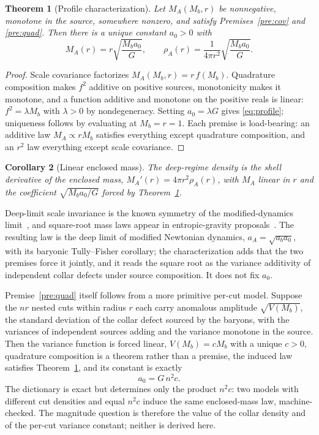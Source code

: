 \documentclass[11pt]{article}
\newtheorem{theorem}{Theorem}[section]
\newtheorem{corollary}[theorem]{Corollary}
\begin{document}
\begin{theorem}[Profile characterization]
\label{thm:char}
Let \(M_A(M_b,r)\) be nonnegative, monotone in the source, somewhere
nonzero, and satisfy Premises~\ref{pre:cov} and \ref{pre:quad}. Then there
is a unique constant \(a_0>0\) with
\begin{equation}
M_A(r)=r\sqrt{\frac{M_ba_0}{G}},
\qquad
\rho_A(r)=\frac{1}{4\pi r^2}\sqrt{\frac{M_ba_0}{G}}.
\label{eq:profile}
\end{equation}
\end{theorem}

\begin{proof}
Scale covariance factorizes \(M_A(M_b,r)=r\,f(M_b)\). Quadrature
composition makes \(f^2\) additive on positive sources, monotonicity makes
it monotone, and a function additive and monotone on the positive reals is
linear: \(f^2=\lambda M_b\) with \(\lambda>0\) by nondegeneracy. Setting
\(a_0=\lambda G\) gives \eqref{eq:profile}; uniqueness follows by
evaluating at \(M_b=r=1\). Each premise is load-bearing: an additive law
\(M_A\propto rM_b\) satisfies everything except quadrature composition, and
an \(r^2\) law everything except scale covariance.
\end{proof}

\begin{corollary}[Linear enclosed mass]
\label{pre:linear}
The deep-regime density is the shell derivative of the enclosed mass,
\(M_A'(r)=4\pi r^2\rho_A(r)\), with \(M_A\) linear in \(r\) and the
coefficient \(\sqrt{M_ba_0/G}\) forced by
Theorem~\ref{thm:char}.
\end{corollary}

Deep-limit scale invariance is the known symmetry of the modified-dynamics
limit~\cite{milgrom2009}, and square-root mass laws appear in
entropic-gravity proposals~\cite{verlinde2016}. The resulting law is the
deep limit of modified Newtonian dynamics, \(a_A=\sqrt{a_ba_0}\), with its
baryonic Tully--Fisher corollary; the characterization adds that the two
premises force it jointly, and it reads the square root as the variance
additivity of independent collar defects under source composition. It does
not fix \(a_0\).

Premise~\ref{pre:quad} itself follows from a more primitive per-cut model.
Suppose the \(nr\) nested cuts within radius \(r\) each carry anomalous
amplitude \(\sqrt{V(M_b)}\), the standard deviation of the collar defect
sourced by the baryons, with the variances of independent sources adding
and the variance monotone in the source. Then the variance function is
forced linear, \(V(M_b)=cM_b\) with a unique \(c>0\), quadrature
composition is a theorem rather than a premise, the induced law satisfies
Theorem~\ref{thm:char}, and its constant is exactly
\begin{equation}
a_0=G\,n^2c .
\label{eq:dictionary}
\end{equation}
The dictionary is exact but determines only the product \(n^2c\): two
models with different cut densities and equal \(n^2c\) induce the same
enclosed-mass law, machine-checked. The magnitude question is therefore
the value of the collar density and of the per-cut variance constant;
neither is derived here.
\end{document}
